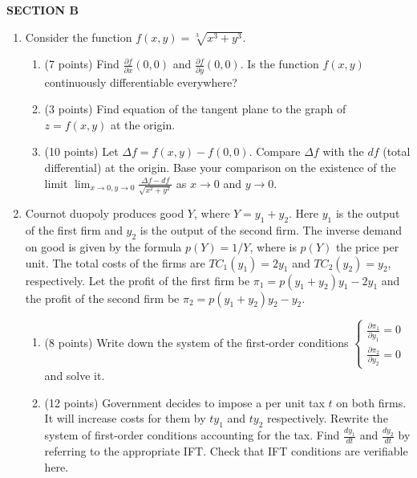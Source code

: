 \textbf{SECTION B}

\begin{enumerate}[resume]


\item Consider the function  $f(x, y) = \sqrt[3]{x^3 + y^3}$.

\begin{enumerate}

\item (7 points) Find $\frac{\partial f}{\partial x}(0,0)$ and $\frac{\partial f}{\partial y}(0,0)$. Is the function $f(x, y)$ continuously differentiable everywhere?
\item (3 points) Find equation of the tangent plane to the graph of $z= f(x,y)$ at the origin.

\item (10 points) Let $\Delta f = f(x,y) - f(0,0)$. Compare $\Delta f$ with the $df$ (total differential) at
the origin. Base your comparison on the existence of the limit $\lim_{x\to0, y\to 0} \frac{\Delta f - df}{\sqrt{x^2 + y^2}}$ as $x\to 0$ and $y\to 0$.
\end{enumerate}

\item Cournot duopoly produces good $Y$, where $Y=y_1 + y_2$. Here $y_1$ is the output of the
first firm and $y_2$ is the output of the second firm. The inverse demand on
good is given by the formula $p(Y)=1/Y$, where is $p(Y)$ the price per unit. The total
costs of the firms are $TC_1(y_1) = 2y_1$ and $TC_2(y_2) = y_2$, respectively. Let the profit of the first
firm be $\pi_1 = p(y_1 + y_2)y_1 - 2y_1$ and the profit of the second firm be $\pi_2 = p(y_1 + y_2)y_2 - y_2$.

\begin{enumerate}
\item (8 points) Write down the system of the first-order
conditions $\begin{cases} \frac{\partial \pi_1}{\partial y_1} =0 \\  \frac{\partial \pi_2}{\partial y_2} =0 \end{cases}$ and solve it.
\item (12 points) Government decides to impose a per unit tax $t$ on
both firms. It will increase costs for them by $ty_1$ and $ty_2$ respectively. Rewrite the system
of first-order conditions accounting for the tax. Find $\frac{dy_1}{dt}$ and $\frac{dy_2}{dt}$ by referring to the
appropriate IFT. Check that IFT conditions are verifiable here.
\end{enumerate}


\end{enumerate}



